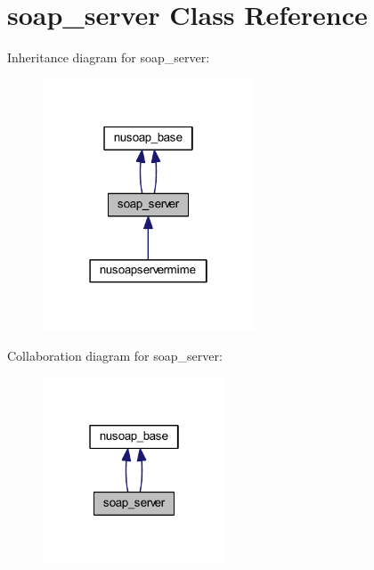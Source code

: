 \hypertarget{classsoap__server}{\section{soap\-\_\-server Class Reference}
\label{classsoap__server}
}


Inheritance diagram for soap\-\_\-server\-:
\nopagebreak
\begin{figure}[H]
\begin{center}
\leavevmode
\includegraphics[width=178pt]{classsoap__server__inherit__graph}
\end{center}
\end{figure}


Collaboration diagram for soap\-\_\-server\-:
\nopagebreak
\begin{figure}[H]
\begin{center}
\leavevmode
\includegraphics[width=154pt]{classsoap__server__coll__graph}
\end{center}
\end{figure}
